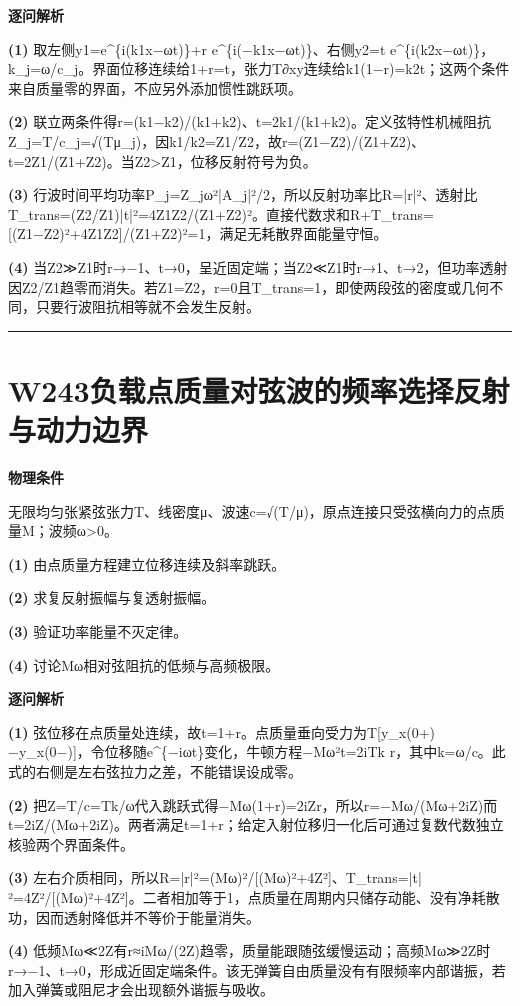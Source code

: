 \documentclass[UTF8,a4paper,11pt,oneside,openany]{ctexbook}
\begin{document}
\par\medskip\noindent\textbf{逐问解析}
\par\noindent\textbf{(1)} 取左侧y1=e\textasciicircum{}\{i(k1x−ωt)\}+r e\textasciicircum{}\{i(−k1x−ωt)\}、右侧y2=t e\textasciicircum{}\{i(k2x−ωt)\}，k\_j=ω/c\_j。界面位移连续给1+r=t，张力T∂xy连续给k1(1−r)=k2t；这两个条件来自质量零的界面，不应另外添加惯性跳跃项。
\par\noindent\textbf{(2)} 联立两条件得r=(k1−k2)/(k1+k2)、t=2k1/(k1+k2)。定义弦特性机械阻抗Z\_j=T/c\_j=√(Tμ\_j)，因k1/k2=Z1/Z2，故r=(Z1−Z2)/(Z1+Z2)、t=2Z1/(Z1+Z2)。当Z2>Z1，位移反射符号为负。
\par\noindent\textbf{(3)} 行波时间平均功率P\_j=Z\_jω²|A\_j|²/2，所以反射功率比R=|r|²、透射比T\_trans=(Z2/Z1)|t|²=4Z1Z2/(Z1+Z2)²。直接代数求和R+T\_trans=[(Z1−Z2)²+4Z1Z2]/(Z1+Z2)²=1，满足无耗散界面能量守恒。
\par\noindent\textbf{(4)} 当Z2≫Z1时r→−1、t→0，呈近固定端；当Z2≪Z1时r→1、t→2，但功率透射因Z2/Z1趋零而消失。若Z1=Z2，r=0且T\_trans=1，即使两段弦的密度或几何不同，只要行波阻抗相等就不会发生反射。

\par\bigskip\hrule\bigskip
\section*{W243\quad 负载点质量对弦波的频率选择反射与动力边界}
\textbf{物理条件}\par 无限均匀张紧弦张力T、线密度μ、波速c=√(T/μ)，原点连接只受弦横向力的点质量M；波频ω>0。
\par\noindent\textbf{(1)} 由点质量方程建立位移连续及斜率跳跃。
\par\noindent\textbf{(2)} 求复反射振幅与复透射振幅。
\par\noindent\textbf{(3)} 验证功率能量不灭定律。
\par\noindent\textbf{(4)} 讨论Mω相对弦阻抗的低频与高频极限。

\par\medskip\noindent\textbf{逐问解析}
\par\noindent\textbf{(1)} 弦位移在点质量处连续，故t=1+r。点质量垂向受力为T[y\_x(0+)−y\_x(0−)]，令位移随e\textasciicircum{}\{−iωt\}变化，牛顿方程−Mω²t=2iTk r，其中k=ω/c。此式的右侧是左右弦拉力之差，不能错误设成零。
\par\noindent\textbf{(2)} 把Z=T/c=Tk/ω代入跳跃式得−Mω(1+r)=2iZr，所以r=−Mω/(Mω+2iZ)而t=2iZ/(Mω+2iZ)。两者满足t=1+r；给定入射位移归一化后可通过复数代数独立核验两个界面条件。
\par\noindent\textbf{(3)} 左右介质相同，所以R=|r|²=(Mω)²/[(Mω)²+4Z²]、T\_trans=|t|²=4Z²/[(Mω)²+4Z²]。二者相加等于1，点质量在周期内只储存动能、没有净耗散功，因而透射降低并不等价于能量消失。
\par\noindent\textbf{(4)} 低频Mω≪2Z有r≈iMω/(2Z)趋零，质量能跟随弦缓慢运动；高频Mω≫2Z时r→−1、t→0，形成近固定端条件。该无弹簧自由质量没有有限频率内部谐振，若加入弹簧或阻尼才会出现额外谐振与吸收。
\end{document}
